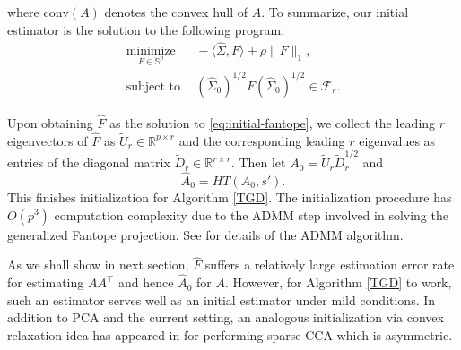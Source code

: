 \documentclass[11pt]{article}
\newcommand{\nb}[1]{\textcolor{orange}{\texttt{[#1]}}}
\newcommand{\gsc}[1]{\textcolor{blue}{\texttt{[#1]}}}
\newcommand{\norminit}{\widetilde{A}_0} %
\newcommand{\bA}{\widehat{A}}
\newcommand{\gd}{\overline{V}}
\newcommand{\0}{{\mathbf{0}}}
\newcommand{\sfirst}{{\widehat{\Sigma}}}
\newcommand{\szerofirst}{{\widehat{\Sigma}_0}}
\begin{document}
where $\text{conv}(A)$ denotes the convex hull of $A.$
To summarize, our initial estimator is the solution to the following program:
\begin{equation}
      \label{eq:initial-fantope}
\begin{aligned}
    \underset{F\in \mathbb{S}^{p}}{\text{minimize}} &~~-\langle \sfirst,F\rangle+\rho \|F\|_1,\\
      \mbox{subject to} &~~(\szerofirst)^{1/2}F(\szerofirst)^{1/2}\in \mathcal{F}_r.
\end{aligned}
\end{equation}



Upon obtaining $\widehat{F}$ as the solution to \eqref{eq:initial-fantope}, we collect the leading $r$ eigenvectors of $\widehat{F}$ as $\widetilde{U}_r\in \mathbb{R}^{p\times r}$ and the corresponding leading $r$ eigenvalues as entries of the diagonal matrix $\widetilde{D}_r\in \mathbb{R}^{r\times r}$.
Then let $A_0 = \widetilde{U}_r \widetilde{D}_r^{1/2}$ and 
\begin{equation}
      \label{eq:initial-A}
\widehat{A}_0  = HT(A_0,s').
\end{equation}
This finishes initialization for Algorithm \ref{TGD}.
The initialization procedure has $O(p^3)$ computation complexity due to the ADMM step involved in solving the generalized Fantope projection. See \cite{gao2017sparse} for details of the ADMM algorithm.

As we shall show in next section, 
$\widehat{F}$
suffers a relatively large estimation error rate for estimating $AA^\top $ and hence  $\widehat{A}_0$ for $A$. 
However, for Algorithm \ref{TGD} to work, such an estimator serves well as an initial estimator under mild conditions. 
In addition to PCA and the current setting, an analogous initialization via convex relaxation idea has appeared in \cite{gao2017sparse} for performing sparse CCA which is asymmetric. 
\end{document}
